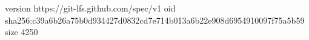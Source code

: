 version https://git-lfs.github.com/spec/v1
oid sha256:c39a6b26a75b0d934427d0832cd7e714b013a6b22e908d6954910097f75a5b59
size 4250
